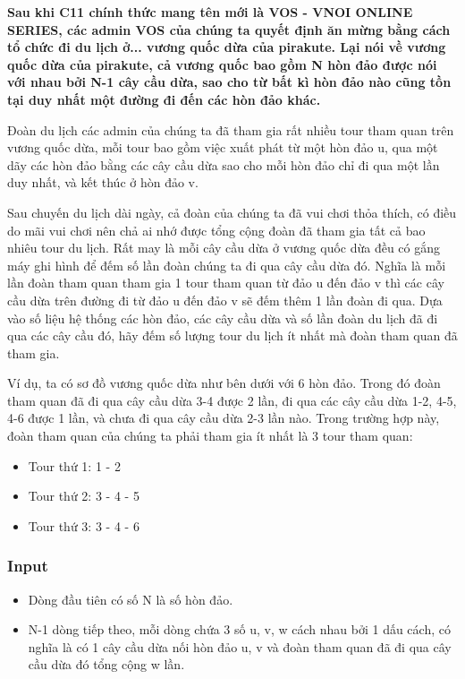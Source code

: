 

\textbf{Sau khi C11 chính thức mang tên mới là VOS - VNOI ONLINE SERIES, các admin VOS của chúng ta quyết định ăn mừng bằng cách tổ chức đi du lịch ở... vương quốc dừa của pirakute. Lại nói về vương quốc dừa của pirakute, cả vương quốc bao gồm \textbf{ N }\textbf{}\textbf{ hòn đảo được nói với nhau bởi }\textbf{\textbf{ N-1 }}\textbf{ cây cầu dừa, sao cho từ bất kì hòn đảo nào cũng tồn tại duy nhất một đường đi đến các hòn đảo khác. }}

Đoàn du lịch các admin của chúng ta đã tham gia rất nhiều tour tham quan trên vương quốc dừa, mỗi tour bao gồm việc xuất phát từ một hòn đảo u, qua một dãy các hòn đảo bằng các cây cầu dừa sao cho mỗi hòn đảo chỉ đi qua một lần duy nhất, và kết thúc ở hòn đảo v.

Sau chuyến du lịch dài ngày, cả đoàn của chúng ta đã vui chơi thỏa thích, có điều do mãi vui chơi nên chả ai nhớ được tổng cộng đoàn đã tham gia tất cả bao nhiêu tour du lịch. Rất may là mỗi cây cầu dừa ở vương quốc dừa đều có gắng máy ghi hình để đếm số lần đoàn chúng ta đi qua cây cầu dừa đó. Nghĩa là mỗi lần đoàn tham quan tham gia 1 tour tham quan từ đảo u đến đảo v thì các cây cầu dừa trên đường đi từ đảo u đến đảo v sẽ đếm thêm 1 lần đoàn đi qua. Dựa vào số liệu hệ thống các hòn đảo, các cây cầu dừa và số lần đoàn du lịch đã đi qua các cây cầu đó, hãy đếm số lượng tour du lịch ít nhất mà đoàn tham quan đã tham gia.

Ví dụ, ta có sơ đồ vương quốc dừa như bên dưới với 6 hòn đảo. Trong đó đoàn tham quan đã đi qua cây cầu dừa 3-4 được 2 lần, đi qua các cây cầu dừa 1-2, 4-5, 4-6 được 1 lần, và chưa đi qua cây cầu dừa 2-3 lần nào. Trong trường hợp này, đoàn tham quan của chúng ta phải tham gia ít nhất là 3 tour tham quan:
\begin{itemize}
	\item Tour thứ 1: 1 - 2
	\item Tour thứ 2: 3 - 4 - 5
	\item Tour thứ 3: 3 - 4 - 6
\end{itemize}

\subsubsection{Input}
\begin{itemize}
	\item Dòng đầu tiên có số N là số hòn đảo.
	\item N-1 dòng tiếp theo, mỗi dòng chứa 3 số u, v, w cách nhau bởi 1 dấu cách, có nghĩa là có 1 cây cầu dừa nối hòn đảo u, v và đoàn tham quan đã đi qua cây cầu dừa đó tổng cộng w lần.
\end{itemize}

